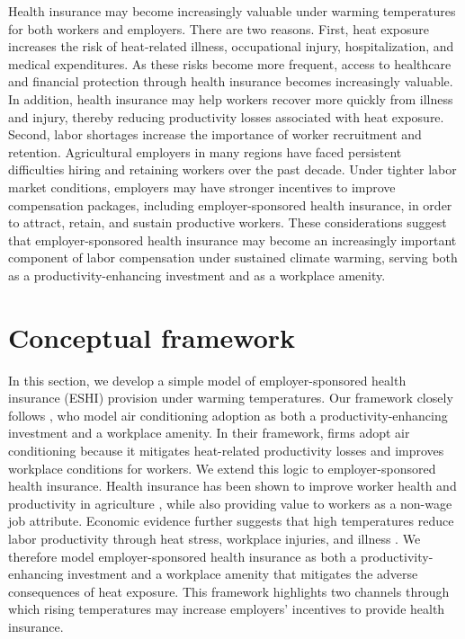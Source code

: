 \documentclass[12pt]{article}
\begin{document}
Health insurance may become increasingly valuable under warming temperatures for both workers and employers. There are two reasons. First, heat exposure increases the risk of heat-related illness, occupational injury, hospitalization, and medical expenditures. As these risks become more frequent, access to healthcare and financial protection through health insurance becomes increasingly valuable. In addition, health insurance may help workers recover more quickly from illness and injury, thereby reducing productivity losses associated with heat exposure.
Second, labor shortages increase the importance of worker recruitment and retention. Agricultural employers in many regions have faced persistent difficulties hiring and retaining workers over the past decade. Under tighter labor market conditions, employers may have stronger incentives to improve compensation packages, including employer-sponsored health insurance, in order to attract, retain, and sustain productive workers.
These considerations suggest that employer-sponsored health insurance may become an increasingly important component of labor compensation under sustained climate warming, serving both as a productivity-enhancing investment and as a workplace amenity.

\clearpage
\section{Conceptual framework}

In this section, we develop a simple model of employer-sponsored health insurance (ESHI) provision under warming temperatures. Our framework closely follows \citet{zivin_industrial_2016}, who model air conditioning adoption as both a productivity-enhancing investment and a workplace amenity. In their framework, firms adopt air conditioning because it mitigates heat-related productivity losses and improves workplace conditions for workers. We extend this logic to employer-sponsored health insurance. Health insurance has been shown to improve worker health and productivity in agriculture \citep{rutledge_health_2026}, while also providing value to workers as a non-wage job attribute. Economic evidence further suggests that high temperatures reduce labor productivity through heat stress, workplace injuries, and illness \citep{graff_zivin_temperature_2014}. We therefore model employer-sponsored health insurance as both a productivity-enhancing investment and a workplace amenity that mitigates the adverse consequences of heat exposure. This framework highlights two channels through which rising temperatures may increase employers’ incentives to provide health insurance.
\end{document}
